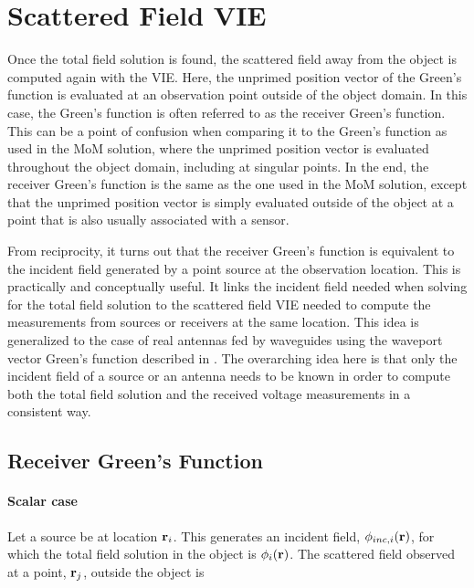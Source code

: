 {\footnotesize
{}
}

\clearpage
\newpage

\section{Scattered Field VIE}

Once the total field solution is found, the scattered field away from the object is computed again with the VIE. Here, the unprimed position vector of the Green's function is evaluated at an observation point outside of the object domain. In this case, the Green's function is often referred to as the receiver Green's function. This can be a point of confusion when comparing it to the Green's function as used in the MoM solution, where the unprimed position vector is evaluated throughout the object domain, including at singular points. In the end, the receiver Green's function is the same as the one used in the MoM solution, except that the unprimed position vector is simply evaluated outside of the object at a point that is also usually associated with a sensor.

From reciprocity, it turns out that the receiver Green's function is equivalent to the incident field generated by a point source at the observation location. This is practically and conceptually useful. It links the incident field needed when solving for the total field solution to the scattered field VIE needed to compute the measurements from sources or receivers at the same location. This idea is generalized to the case of real antennas fed by waveguides using the waveport vector Green's function described in \cite{haynes2012vector}. The overarching idea here is that only the incident field of a source or an antenna needs to be known in order to compute both the total field solution and the received voltage measurements in a consistent way. 

\subsection{Receiver Green's Function}
\paragraph{Scalar case}
Let a source be at location $\mathbf{r}_i$. This generates an incident field, $\phi_{inc,i}(\mathbf{r})$, for which the total field solution in the object is $\phi_{i}(\mathbf{r})$. The scattered field observed at a point, $\mathbf{r}_j$, outside the object is

